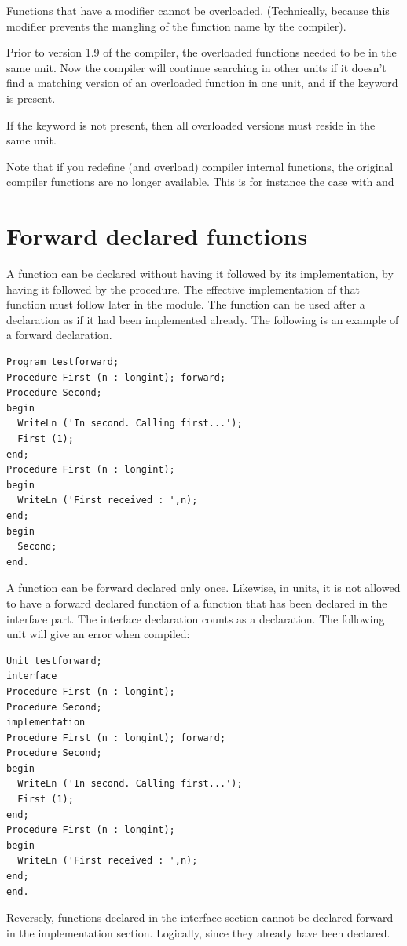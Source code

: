 Functions that have a  modifier cannot be overloaded.
(Technically, because this modifier prevents the mangling of
the function name by the compiler).

Prior to version 1.9 of the compiler, the overloaded functions needed to be
in the same unit. Now the compiler will continue searching in other units if
it doesn't find a matching version of an overloaded function in one unit,
and if the  keyword is present.

If the  keyword is not present, then all overloaded versions
must reside in the same unit.

\begin{remark}
Note that if you redefine (and overload) compiler internal functions, the
original compiler functions are no longer available. This is for instance
the case with  and 
\end{remark}



\section{Forward declared functions}
 
A function can be declared without having it followed by its implementation,
by having it followed by the  procedure. The effective
implementation of that function must follow later in the module.
The function can be used after a  declaration as if it had been
implemented already.
The following is an example of a forward declaration.
\begin{verbatim}
Program testforward;
Procedure First (n : longint); forward;
Procedure Second;
begin
  WriteLn ('In second. Calling first...');
  First (1);
end;
Procedure First (n : longint);
begin
  WriteLn ('First received : ',n);
end;
begin
  Second;
end.
\end{verbatim}
A function can be forward declared only once.
Likewise, in units, it is not allowed to have a forward declared function
of a function that has been declared in the interface part. The interface
declaration counts as a  declaration.
The following unit will give an error when compiled:
\begin{verbatim}
Unit testforward;
interface
Procedure First (n : longint);
Procedure Second;
implementation
Procedure First (n : longint); forward;
Procedure Second;
begin
  WriteLn ('In second. Calling first...');
  First (1);
end;
Procedure First (n : longint);
begin
  WriteLn ('First received : ',n);
end;
end.
\end{verbatim}
Reversely, functions declared in the interface section cannot be declared
forward in the implementation section. Logically, since they already have
been declared.

